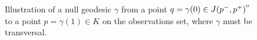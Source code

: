 
\begin{figure}\label{fig:Transversality}
    \centering
    
    \caption{Illustration of a null geodesic $\gamma$ from a point $q=\gamma(0)\in {\kern0ptJ(p^-,p^+)}^{\mathrm{o}}$ to a point $p=\gamma(1)\in K$ on the observations set, where $\gamma$ must be transversal.}
\end{figure}


